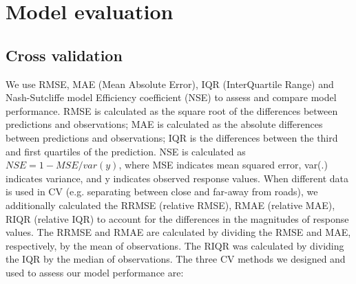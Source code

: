 \documentclass{article}
\begin{document}
\section{Model evaluation}

\subsection{Cross validation}
We use RMSE, MAE (Mean Absolute Error), IQR (InterQuartile Range) and Nash-Sutcliffe model Efficiency coefficient (NSE) to assess and compare model performance. RMSE is calculated as the square root of the differences between predictions and observations; MAE is calculated as the absolute differences between predictions and observations; IQR is the differences between the third and first quartiles of the prediction. NSE is calculated as $NSE = 1- MSE / var(y)$, where MSE indicates mean squared error, var(.) indicates variance, and y indicates observed response values. %
When different data is used in CV (e.g. separating between close and far-away from roads), we additionally calculated the RRMSE (relative RMSE), RMAE (relative MAE), RIQR (relative IQR) to account for the differences in the magnitudes of response values. The RRMSE and RMAE are calculated by dividing the RMSE and MAE, respectively, by the mean of observations. The RIQR was calculated by dividing the IQR by the median of observations. The three CV methods we designed and used to assess our model performance are: 
\end{document}
